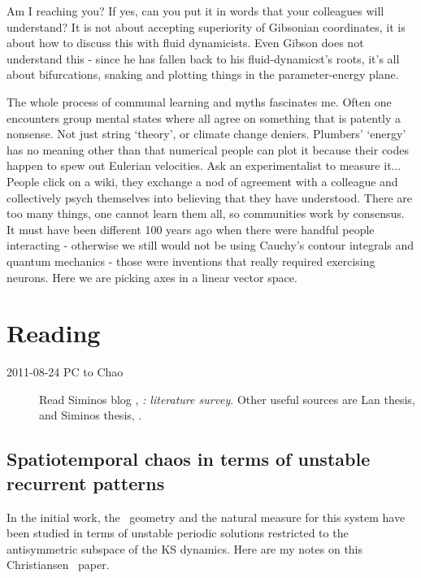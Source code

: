 \begin{description}
\medskip

Am I reaching you? If yes, can you put it in words that your colleagues
will understand? It is not about accepting superiority of Gibsonian
coordinates, it is about how to discuss this with fluid dynamicists. Even
Gibson does not understand this - since he has fallen back to his
fluid-dynamicst's roots, it's all about bifurcations, snaking and plotting
things in the parameter-energy plane.


\medskip

The whole process of communal learning and myths fascinates me. Often one
encounters group mental states where all agree on something that is
patently a nonsense. Not just string `theory', or climate change deniers.
Plumbers' `energy' has no meaning other than that numerical people can
plot it because their codes happen to spew out Eulerian velocities. Ask
an experimentalist to measure it... People click on a wiki, they exchange
a nod of agreement with a colleague and collectively psych themselves
into believing that they have understood. There are too many things, one
cannot learn them all, so communities work by consensus. It must have
been different 100 years ago when there were handful people interacting -
otherwise we still would not be using Cauchy's contour integrals and
quantum mechanics - those were inventions that really required exercising
neurons. Here we are picking axes in a linear vector space.

\end{description}


\section{Reading}
\label{s:KSreading}

\begin{description}
\item[2011-08-24 PC to Chao]
Read Siminos blog , \emph{ \KS: literature survey}.
Other useful sources are Lan thesis,  and Siminos
thesis, .
\end{description}


\subsection{Spatiotemporal chaos in terms of unstable recurrent patterns}
\label{s:Christiansen97}

In the initial work, the \statesp\ geometry and the natural measure for
this system have been
studied in terms of unstable
periodic solutions restricted to the antisymmetric subspace of the
KS dynamics. Here are my notes on this Christiansen \etal\ paper.

